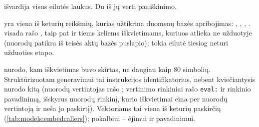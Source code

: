  išvardija visus eilutės laukus. Du iš jų verti paaiškinimo.

 yra viena iš keturių reikšmių, kurias užtikrina duomenų bazės apribojimas:
, , , .  visada rašo
, taip pat ir tiems keliems iškvietimams, kuriuos atlieka ne užduotyje (nuorodų
patikra iš teisės aktų bazės puslapio); tokia eilutė tiesiog neturi užduoties etapo.

 nurodo, kam iškvietimas buvo skirtas, ne daugiau kaip 80 simbolių.
Struktūrizuotam generavimui tai instrukcijos identifikatorius, nebent kviečiantysis nurodo kitą
(nuorodų vertintojas rašo ; vertinimo rinkiniai rašo \texttt{eval:} ir
rinkinio pavadinimą, išskyrus nuorodų rinkinį, kurio iškvietimai eina per nuorodų vertintoją ir
neša jo paskirtį). Vektoriams tai viena iš keturių paskirčių (\cref{tab:models:embedcallers});
pokalbiui --  ėjimui ir  pavadinimui.

